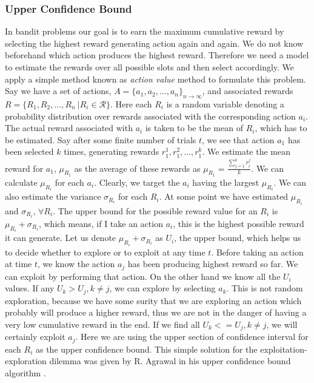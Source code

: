 \documentclass[english]{tktltiki}
\begin{document}
\subsubsection{Upper Confidence Bound}
\label{sec:UCB}
In bandit problems our goal is to earn the maximum cumulative reward by selecting the highest reward generating action again and again. We do not know beforehand which action produces the highest reward. Therefore we need a model to estimate the rewards over all possible slots and then select accordingly. We apply a simple method known as \textit{action value} method \cite{reinforcement_learning} to formulate this problem. Say we have a set of actions, $A = \{a_1, a_2, ..., a_n\}_{n \to \infty}$, and associated rewards $R = \{R_1, R_2, ..., R_n\ | R_i \in \mathcal{R}\}$. Here each $R_i$ is a random variable denoting a probability distribution over rewards associated with the corresponding action $a_i$. The actual reward associated with $a_i$ is taken to be the mean of $R_i$, which has to be estimated. Say after some finite number of trials $t$, we see that action $a_1$ has been selected $k$ times, generating rewards $r_1^1, r_1^2, ..., r_1^k$. We estimate the mean reward for $a_1$, $\mu_{R_1}$ as the average of these rewards as $\mu_{R_1} = \frac{\sum_{j = 1}^k{r_i^j}}{k}$. We can calculate $\mu_{R_i}$ for each $a_i$. Clearly, we target the $a_i$ having the largest $\mu_{R_i}$. We can also estimate the variance $\sigma_{R_i}$ for each $R_i$. At some point we have estimated $\mu_{R_i}$ and $\sigma_{R_i}$, $\forall R_i$. The upper bound for the possible reward value for an $R_i$ is $\mu_{R_i} + \sigma_{R_i}$, which means, if I take an action $a_i$, this is the highest possible reward it can generate. Let us denote $\mu_{R_i} + \sigma_{R_i}$ as $U_i$, the upper bound, which helps us to decide whether to explore or to exploit at any time $t$. Before taking an action at time $t$, we know the action $a_j$ has been producing highest reward so far. We can exploit by performing that action. On the other hand we know all the $U_i$ values. If any $U_k > U_j, k \neq j$, we can explore by selecting $a_k$. This is not random exploration, because we have some surity that we are exploring an action which probably will produce a higher reward, thus we are not in the danger of having a very low cumulative reward in the end. If we find all $U_k <= U_j, k \neq j$, we will certainly exploit $a_j$. Here we are using the upper section of confidence interval for each $R_i$ as the upper confidence bound. This simple solution for the exploitation-exploration dilemma was given by R. Agrawal in his upper confidence bound algorithm \cite{ucb}.
\end{document}
